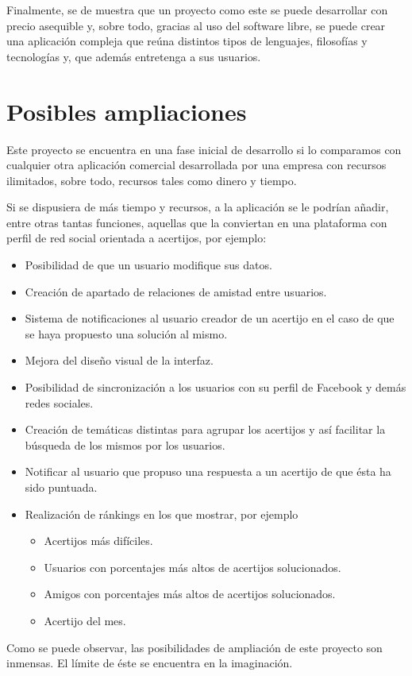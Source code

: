 Finalmente, se de muestra que un proyecto como este se puede desarrollar con precio asequible y, sobre todo, gracias al uso del software libre, se puede crear una aplicación compleja que reúna distintos tipos de lenguajes, filosofías y tecnologías y, que además entretenga a sus usuarios.

\section{Posibles ampliaciones}

Este proyecto se encuentra en una fase inicial de desarrollo si lo comparamos con cualquier otra aplicación comercial desarrollada por una empresa con recursos ilimitados, sobre todo, recursos tales como dinero y tiempo.

Si se dispusiera de más tiempo y recursos, a la aplicación se le podrían añadir, entre otras tantas funciones, aquellas que la conviertan en una plataforma con perfil de red social orientada a acertijos, por ejemplo:

\begin{itemize}
    \item Posibilidad de que un usuario modifique sus datos.
    \item Creación de apartado de relaciones de amistad entre usuarios.
    \item Sistema de notificaciones al usuario creador de un acertijo en el caso de que se haya propuesto una solución al mismo.
    \item Mejora del diseño visual de la interfaz.
    \item Posibilidad de sincronización a los usuarios con su perfil de Facebook y demás redes sociales.
    \item Creación de temáticas distintas para agrupar los acertijos y así facilitar la búsqueda de los mismos por los usuarios.
    \item Notificar al usuario que propuso una respuesta a un acertijo de que ésta ha sido puntuada.
    \item Realización de ránkings en los que mostrar, por ejemplo 
        \begin{itemize}
            \item Acertijos más difíciles.
            \item Usuarios con porcentajes más altos de acertijos solucionados.
            \item Amigos con porcentajes más altos de acertijos solucionados.
            \item Acertijo del mes.
        \end{itemize}
\end{itemize}

Como se puede observar, las posibilidades de ampliación de este proyecto son inmensas. El límite de éste se encuentra en la imaginación.
